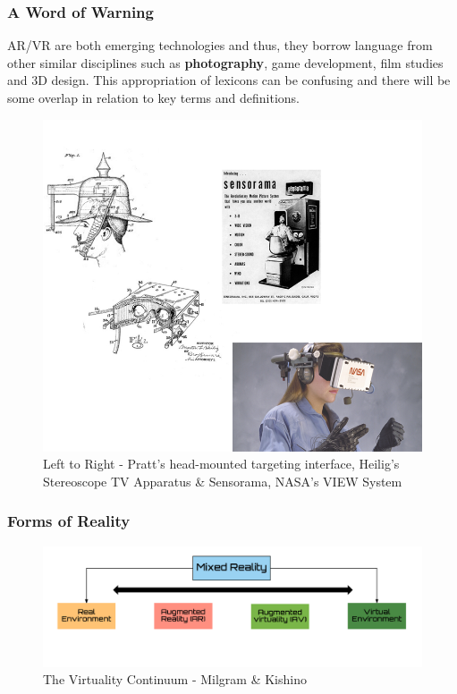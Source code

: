 \begin{frame}
	\frametitle{A Word of Warning}
	AR/VR are both emerging technologies and thus, they borrow language from other similar disciplines such as \textbf{photography}, game development, film studies and 3D design. This appropriation of lexicons can be confusing and there will be some overlap in relation to key terms and definitions.
\end{frame}

\begin{frame}
	\begin{figure}
		\includegraphics[scale=.6]{assets/history.png}
		\caption{\tiny{Left to Right - Pratt's head-mounted targeting interface, Heilig's Stereoscope TV Apparatus \& Sensorama, NASA's VIEW System} }
	\end{figure}
\end{frame}


\begin{frame}
	\frametitle{Forms of Reality}
	\begin{figure}
		\includegraphics[scale=.2]{assets/continuum.png}
		\caption{The Virtuality Continuum - Milgram \& Kishino}
	\end{figure}
\end{frame}


